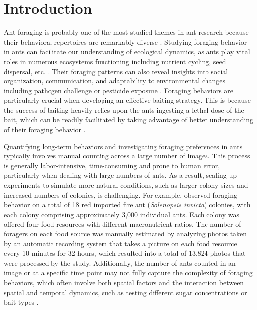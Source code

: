 \section{Introduction}

Ant foraging is probably one of the most studied themes in ant research because their behavioral repertoires are remarkably diverse \cite{Reeves2019Evolution}. Studying foraging behavior in ants can facilitate our understanding of ecological dynamics, as ants play vital roles in numerous ecosystems functioning including nutrient cycling, seed dispersal, etc. \cite{Parr2022Response}. Their foraging patterns can also reveal insights into social organization, communication, and adaptability to environmental changes including pathogen challenge \cite{Alciatore2021Immune} or pesticide exposure \cite{Thiel2016Sublethal}. Foraging behaviors are particularly crucial when developing an effective baiting strategy. This is because the success of baiting heavily relies upon the ants ingesting a lethal dose of the bait, which can be readily facilitated by taking advantage of better understanding of their foraging behavior \cite{Galante2024Acute}.

Quantifying long-term behaviors and investigating foraging preferences in ants typically involves manual counting across a large number of images. This process is generally labor-intensive, time-consuming and prone to human error, particularly when dealing with large numbers of ants. As a result, scaling up experiments to simulate more natural conditions, such as larger colony sizes and increased numbers of colonies, is challenging. For example, \cite{Hsu2018Viral} observed foraging behavior on a total of 18 red imported fire ant (\emph{Solenopsis invicta}) colonies, with each colony comprising approximately 3,000 individual ants. Each colony was offered four food resources with different macronutrient ratios. The number of foragers on each food source was manually estimated by analyzing photos taken by an automatic recording system that takes a picture on each food resource every 10 minutes for 32 hours, which resulted into a total of 13,824 photos that were processed by the study. Additionally, the number of ants counted in an image or at a specific time point may not fully capture the complexity of foraging behaviors, which often involve both spatial factors and the interaction between spatial and temporal dynamics, such as testing different sugar concentrations \cite{Sola2016Feeding} or bait types \cite{Du2023Foraging}. 
    
